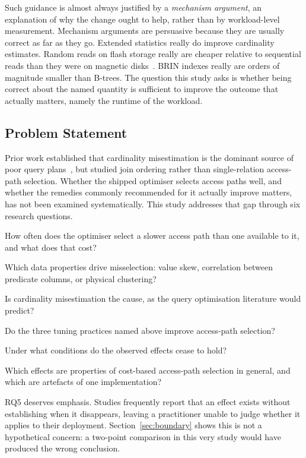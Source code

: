 \documentclass[12pt, a4paper]{article}
\begin{document}
Such guidance is almost always justified by a \emph{mechanism argument},
an explanation of why the change ought to help, rather than by
workload-level measurement. Mechanism arguments are persuasive because
they are usually correct as far as they go. Extended statistics really
do improve cardinality estimates. Random reads on flash storage really
are cheaper relative to sequential reads than they were on magnetic
disks~\cite{graefe2009fast, lee2009advances}. BRIN indexes really are
orders of magnitude smaller than B-trees. The question this study asks
is whether being correct about the named quantity is sufficient to
improve the outcome that actually matters, namely the runtime of the
workload.

\subsection{Problem Statement}

Prior work established that cardinality misestimation is the dominant
source of poor query plans~\cite{leis2015good, leis2018query}, but
studied join ordering rather than single-relation access-path selection.
Whether the shipped optimiser selects access paths well, and whether the
remedies commonly recommended for it actually improve matters, has not
been examined systematically. This study addresses that gap through six
research questions.

\begin{description}[leftmargin=1.6cm, style=nextline, nosep]
\item[RQ1] How often does the optimiser select a slower access path than
  one available to it, and what does that cost?
\item[RQ2] Which data properties drive misselection: value skew,
  correlation between predicate columns, or physical clustering?
\item[RQ3] Is cardinality misestimation the cause, as the query
  optimisation literature would predict?
\item[RQ4] Do the three tuning practices named above improve
  access-path selection?
\item[RQ5] Under what conditions do the observed effects cease to hold?
\item[RQ6] Which effects are properties of cost-based access-path
  selection in general, and which are artefacts of one implementation?
\end{description}

RQ5 deserves emphasis. Studies frequently report that an effect exists
without establishing when it disappears, leaving a practitioner unable
to judge whether it applies to their deployment.
Section~\ref{sec:boundary} shows this is not a hypothetical concern: a
two-point comparison in this very study would have produced the wrong
conclusion.
\end{document}
